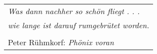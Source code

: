 \mbox{}
\vspace{5cm}
\begin{flushright}
\begin{tabular}{l}
{\it Was dann nachher so sch\"on fliegt . . .} \\
{\it wie lange ist darauf rumgebr\"utet worden.} \\
\\
Peter R\"uhmkorf: {\sl Ph\"onix voran}
\end{tabular}
\end{flushright}

